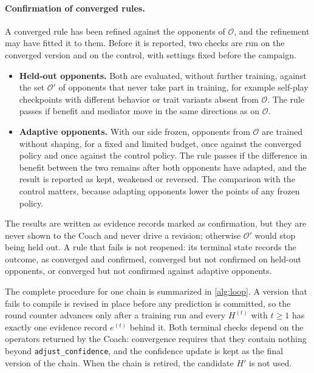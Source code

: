 \documentclass[11pt]{article}
\newcommand{\opp}{\mathcal{O}}           %
\newcommand{\code}[1]{\texttt{\small #1}}
\begin{document}
\paragraph{Confirmation of converged rules.}
\label{sec:confirm}
A converged rule has been refined against the opponents of $\opp$, and the refinement may have fitted it to them.
Before it is reported, two checks are run on the converged version and on the control, with settings fixed before the campaign.
\begin{itemize}[leftmargin=*,itemsep=2pt]
  \item \textbf{Held-out opponents.} Both are evaluated, without further training, against the set $\opp'$ of opponents that never take part in training, for example self-play checkpoints with different behavior or trait variants absent from $\opp$.
    The rule passes if benefit and mediator move in the same directions as on $\opp$.
  \item \textbf{Adaptive opponents.} With our side frozen, opponents from $\opp$ are trained without shaping, for a fixed and limited budget, once against the converged policy and once against the control policy.
    The rule passes if the difference in benefit between the two remains after both opponents have adapted, and the result is reported as kept, weakened or reversed.
    The comparison with the control matters, because adapting opponents lower the points of any frozen policy.
\end{itemize}
The results are written as evidence records marked as confirmation, but they are never shown to the Coach and never drive a revision; otherwise $\opp'$ would stop being held out.
A rule that fails is not reopened: its terminal state records the outcome, as converged and confirmed, converged but not confirmed on held-out opponents, or converged but not confirmed against adaptive opponents.

The complete procedure for one chain is summarized in \cref{alg:loop}.
A version that fails to compile is revised in place before any prediction is committed, so the round counter advances only after a training run and every $H^{(t)}$ with $t \ge 1$ has exactly one evidence record $e^{(t)}$ behind it.
Both terminal checks depend on the operators returned by the Coach: convergence requires that they contain nothing beyond \code{adjust\_confidence}, and the confidence update is kept as the final version of the chain.
When the chain is retired, the candidate $H'$ is not used.
\end{document}
